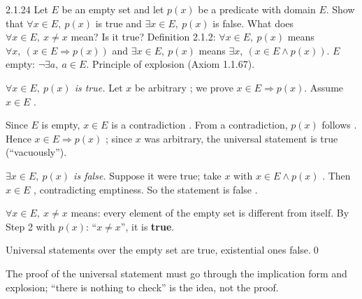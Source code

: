 \begin{bookex}[recommended]{2.1.24}
Let $E$ be an empty set and let $p(x)$ be a predicate with domain $E$. Show that $\forall x\in E,\ p(x)$ is true and $\exists x\in E,\ p(x)$ is false. What does $\forall x\in E,\ x\ne x$ mean? Is it true?
\solution
\given Definition 2.1.2: $\forall x\in E,\ p(x)$ means $\forall x,\ (x\in E\Rightarrow p(x))$ and $\exists x\in E,\ p(x)$ means $\exists x,\ (x\in E\wedge p(x))$. $E$ empty: $\neg\exists a,\ a\in E$. Principle of explosion (Axiom 1.1.67).
\begin{steps}
\item \emph{$\forall x\in E,\ p(x)$ is true.} Let $x$ be arbitrary ; we prove $x\in E\Rightarrow p(x)$. Assume $x\in E$ .
\item Since $E$ is empty, $x\in E$ is a contradiction . From a contradiction, $p(x)$ follows . Hence $x\in E\Rightarrow p(x)$ ; since $x$ was arbitrary, the universal statement is true (``vacuously'').
\item \emph{$\exists x\in E,\ p(x)$ is false.} Suppose it were true; take $x$ with $x\in E\wedge p(x)$ . Then $x\in E$ , contradicting emptiness. So the statement is false .
\item \emph{$\forall x\in E,\ x\ne x$} means: every element of the empty set is different from itself. By Step 2 with $p(x)$: ``$x\ne x$'', it is \textbf{true}.
\end{steps}
\conclusion Universal statements over the empty set are true, existential ones false.\qed
\begin{compare}
\item The proof of the universal statement must go through the implication form and explosion; ``there is nothing to check'' is the idea, not the proof.
\end{compare}
\end{bookex}

